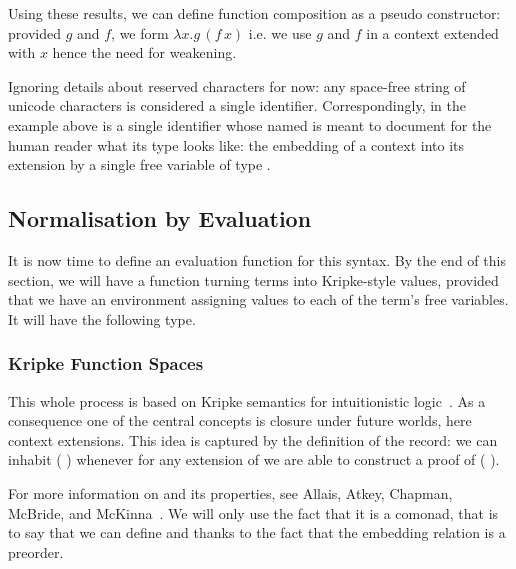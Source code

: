 
Using these results, we can define function composition
as a pseudo constructor: provided $g$ and $f$, we form
$λx.g\,\left(f\, x\right)$ i.e. we use $g$ and $f$ in a context extended
with $x$ hence the need for weakening.

\label{def:composition}

\begin{remark}
  Ignoring details about reserved characters for now: any
  space-free string of unicode characters is considered a
  single identifier.
  Correspondingly, in the example above  is a single
  identifier whose named is meant to document for the human reader
  what its type looks like: the embedding of a context  into
  its extension by a single free variable of type .
\end{remark}

\subsection{Normalisation by Evaluation}

It is now time to define an evaluation function for this syntax.
By the end of this section, we will have a function 
turning terms into Kripke-style values,
provided that we have an environment assigning values
to each of the term's free variables. It will have the following type.


\subsubsection{Kripke Function Spaces}

This whole process is based on Kripke semantics for intuitionistic
logic~\cite{DBLP:journals/apal/MitchellM91}.
As a consequence one of the central concepts is closure under future
worlds, here context extensions.
This idea is captured by the definition of the  record: we
can inhabit (  ) whenever for any extension
 of  we are able to construct a proof of ( ).


For more information on  and its properties, see
Allais, Atkey, Chapman, McBride, and
McKinna~\cite[Section~3.1]{DBLP:journals/jfp/AllaisACMM21}.
%
We will only use the fact that it is a comonad, that is to say that
we can define  and  thanks to
the fact that the embedding relation is a preorder.

